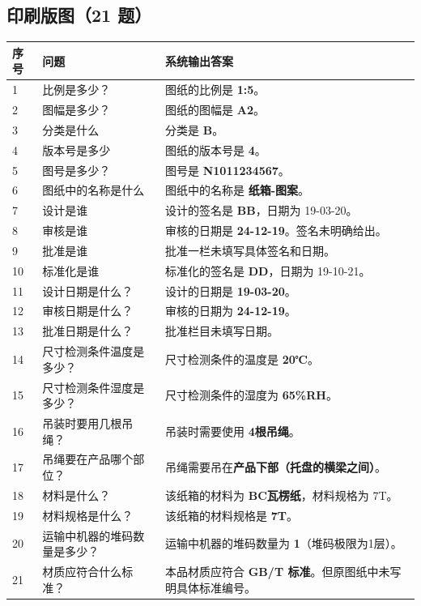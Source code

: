 \documentclass[11pt,a4paper]{article}
\begin{document}
\subsection{印刷版图（21 题）}

\begin{longtable}{p{}p{}p{}}
\toprule
序号 & 问题 & 系统输出答案 \\
\midrule
\endhead
1 & 比例是多少？ & 图纸的比例是 \textbf{1:5}。 \\
\hline
2 & 图幅是多少？ & 图纸的图幅是 \textbf{A2}。 \\
\hline
3 & 分类是什么 & 分类是 \textbf{B}。 \\
\hline
4 & 版本号是多少 & 图纸的版本号是 \textbf{4}。 \\
\hline
5 & 图号是多少？ & 图号是 \textbf{N1011234567}。 \\
\hline
6 & 图纸中的名称是什么 & 图纸中的名称是 \textbf{纸箱-图案}。 \\
\hline
7 & 设计是谁 & 设计的签名是 \textbf{BB}，日期为 19-03-20。 \\
\hline
8 & 审核是谁 & 审核的日期是 \textbf{24-12-19}。签名未明确给出。 \\
\hline
9 & 批准是谁 & 批准一栏未填写具体签名和日期。 \\
\hline
10 & 标准化是谁 & 标准化的签名是 \textbf{DD}，日期为 19-10-21。 \\
\hline
11 & 设计日期是什么？ & 设计的日期是 \textbf{19-03-20}。 \\
\hline
12 & 审核日期是什么？ & 审核的日期为 \textbf{24-12-19}。 \\
\hline
13 & 批准日期是什么？ & 批准栏目未填写日期。 \\
\hline
14 & 尺寸检测条件温度是多少？ & 尺寸检测条件的温度是 \textbf{20℃}。 \\
\hline
15 & 尺寸检测条件湿度是多少？ & 尺寸检测条件的湿度为 \textbf{65\%RH}。 \\
\hline
16 & 吊装时要用几根吊绳？ & 吊装时需要使用 \textbf{4根吊绳}。 \\
\hline
17 & 吊绳要在产品哪个部位？ & 吊绳需要吊在\textbf{产品下部（托盘的横梁之间）}。 \\
\hline
18 & 材料是什么？ & 该纸箱的材料为 \textbf{BC瓦楞纸}，材料规格为 7T。 \\
\hline
19 & 材料规格是什么？ & 该纸箱的材料规格是 \textbf{7T}。 \\
\hline
20 & 运输中机器的堆码数量是多少？ & 运输中机器的堆码数量为 \textbf{1}（堆码极限为1层）。 \\
\hline
21 & 材质应符合什么标准？ & 本品材质应符合 \textbf{GB/T 标准}。但原图纸中未写明具体标准编号。 \\
\bottomrule
\end{longtable}
\end{document}
